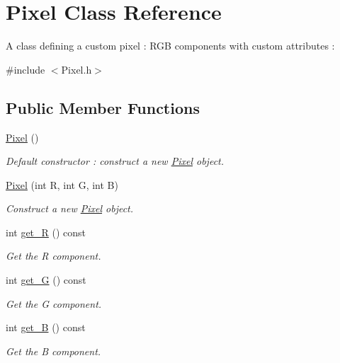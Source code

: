 \hypertarget{classPixel}{}\section{Pixel Class Reference}
\label{classPixel}


A class defining a custom pixel \+: R\+GB components with custom attributes \+:  




{\ttfamily \#include $<$Pixel.\+h$>$}

\subsection*{Public Member Functions}
\begin{DoxyCompactItemize}
\item 
\mbox{\label{classPixel_a27ad99a2f705e635c42d242d530d4756}} 
\hyperlink{classPixel_a27ad99a2f705e635c42d242d530d4756}{Pixel} ()
\begin{DoxyCompactList}\small\item\em Default constructor \+: construct a new \hyperlink{classPixel}{Pixel} object. \end{DoxyCompactList}\item 
\hyperlink{classPixel_a9ba4bf2d33c6d503e30059e61a43c045}{Pixel} (int R, int G, int B)
\begin{DoxyCompactList}\small\item\em Construct a new \hyperlink{classPixel}{Pixel} object. \end{DoxyCompactList}\item 
int \hyperlink{classPixel_ab2a26e47e90930b95012d56ca4dab3c0}{get\+\_\+R} () const
\begin{DoxyCompactList}\small\item\em Get the R component. \end{DoxyCompactList}\item 
int \hyperlink{classPixel_a7b8fb5740fe9ba2ff2960aa6d144cafe}{get\+\_\+G} () const
\begin{DoxyCompactList}\small\item\em Get the G component. \end{DoxyCompactList}\item 
int \hyperlink{classPixel_a50ea40ab4b069cd9cebe3a4d006466b4}{get\+\_\+B} () const
\begin{DoxyCompactList}\small\item\em Get the B component. \end{DoxyCompactList}\item 

\end{DoxyCompactItemize}
